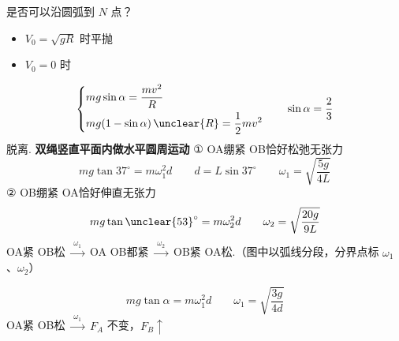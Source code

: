 是否可以沿圆弧到 $N$ 点？
\begin{itemize}
\item $V_0=\sqrt{gR}$ 时平抛
\item $V_0=0$ 时
\end{itemize}
\[
\left\{\begin{aligned}
&mg\sin\alpha=\dfrac{mv^2}{R}\\
&mg(1-\sin\alpha)\,\unclear{R}=\dfrac12mv^2
\end{aligned}\right.
\qquad \sin\alpha=\dfrac23
\]
脱离.
\textbf{双绳竖直平面内做水平圆周运动}
① OA绷紧 OB恰好松弛无张力
\[ mg\tan37^\circ=m\omega_1^2d\qquad d=L\sin37^\circ\qquad \omega_1=\sqrt{\dfrac{5g}{4L}} \]
② OB绷紧 OA恰好伸直无张力
\[ mg\tan\unclear{53}^\circ=m\omega_2^2d\qquad \omega_2=\sqrt{\dfrac{20g}{9L}} \]
OA紧 OB松 $\xrightarrow{\ \omega_1\ }$ OA OB都紧 $\xrightarrow{\ \omega_2\ }$ OB紧 OA松.（图中以弧线分段，分界点标 $\omega_1$、$\omega_2$）

\[ mg\tan\alpha=m\omega_1^2d\qquad \omega_1=\sqrt{\dfrac{3g}{4d}} \]
OA紧 OB松 $\xrightarrow{\ \omega_1\ }$ $F_A$ 不变，$F_B\uparrow$

